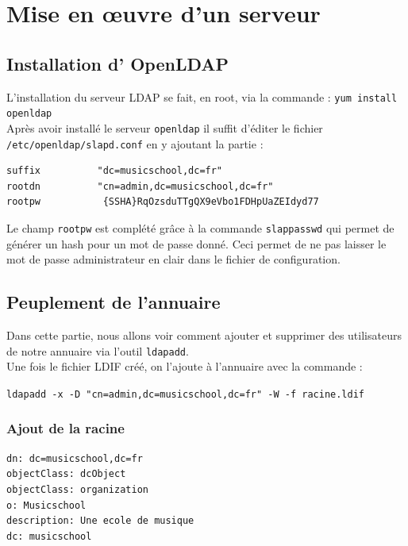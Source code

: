 \documentclass[12pt,a4paper,notitlepage]{article}
\begin{document}
\clearpage
\section{Mise en \oe uvre d'un serveur}
\subsection{Installation d' OpenLDAP}

L'installation du serveur LDAP se fait, en root, via la commande : \texttt{yum install openldap}\\

Après avoir installé le serveur \texttt{openldap} il suffit d'éditer le fichier \texttt{/etc/openldap/slapd.conf} en y ajoutant la partie : 

\begin{lstlisting}[title=Contenu du fichier slapd.conf]
suffix          "dc=musicschool,dc=fr"
rootdn          "cn=admin,dc=musicschool,dc=fr"
rootpw           {SSHA}RqOzsduTTgQX9eVbo1FDHpUaZEIdyd77

\end{lstlisting}

Le champ  \texttt{rootpw} est complété grâce à la commande \texttt{slappasswd} qui permet de générer un hash pour un mot de passe donné. Ceci permet de ne pas laisser le mot de passe administrateur en clair dans le fichier de configuration.\\


\subsection{Peuplement de l'annuaire}
Dans cette partie, nous allons voir comment ajouter et supprimer des utilisateurs de notre annuaire via l'outil \texttt{ldapadd}.\\

Une fois le fichier LDIF créé, on l'ajoute à l'annuaire avec la commande :

\noindent \texttt{ldapadd -x -D "cn=admin,dc=musicschool,dc=fr" -W -f racine.ldif}

\subsubsection{Ajout de la racine}

\begin{lstlisting}[title=racine.ldif]
dn: dc=musicschool,dc=fr
objectClass: dcObject
objectClass: organization
o: Musicschool
description: Une ecole de musique 
dc: musicschool 
\end{lstlisting}
\end{document}
